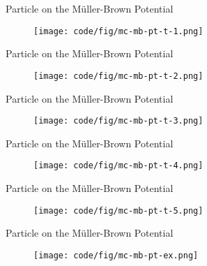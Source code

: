 \documentclass[10pt]{beamer}
\begin{document}
\begin{frame}{Particle on the M\"uller-Brown Potential}
\begin{figure}
  \texttt{[image: code/fig/mc-mb-pt-t-1.png]}
\end{figure}
\end{frame}

\begin{frame}{Particle on the M\"uller-Brown Potential}
\begin{figure}
  \texttt{[image: code/fig/mc-mb-pt-t-2.png]}
\end{figure}
\end{frame}

\begin{frame}{Particle on the M\"uller-Brown Potential}
\begin{figure}
  \texttt{[image: code/fig/mc-mb-pt-t-3.png]}
\end{figure}
\end{frame}

\begin{frame}{Particle on the M\"uller-Brown Potential}
\begin{figure}
  \texttt{[image: code/fig/mc-mb-pt-t-4.png]}
\end{figure}
\end{frame}

\begin{frame}{Particle on the M\"uller-Brown Potential}
\begin{figure}
  \texttt{[image: code/fig/mc-mb-pt-t-5.png]}
\end{figure}
\end{frame}

\begin{frame}{Particle on the M\"uller-Brown Potential}
\begin{figure}
  \texttt{[image: code/fig/mc-mb-pt-ex.png]}
\end{figure}
\end{frame}
\end{document}
